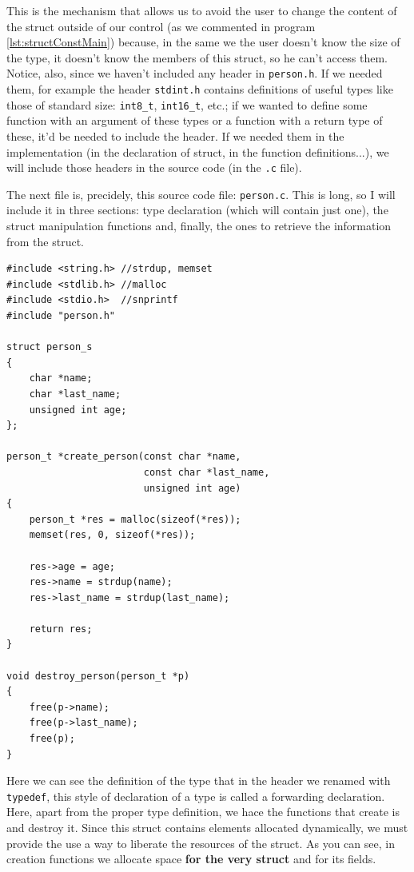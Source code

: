 \documentclass[a4paper]{article}
\begin{document}
This is the mechanism that allows us to avoid the user to change the content of
the struct outside of our control (as we commented in program
\ref{lst:structConstMain}) because, in the same we the user doesn't know the
size of the type, it doesn't know the members of this struct, so he can't
access them. Notice, also, since we haven't included any header in
\verb!person.h!. If we needed them, for example the header \verb!stdint.h!
contains definitions of useful types like those of standard size: \verb!int8_t!,
\verb!int16_t!, etc.; if we wanted to define some function with an argument of
these types or a function with a return type of these, it'd be needed to
include the header. If we needed them in the implementation (in the declaration
of struct, in the function definitions...), we will include those headers in the
source code (in the \verb!.c! file).

The next file is, precidely, this source code file: \verb!person.c!. This is
long, so I will include it in three sections: type declaration (which will
contain just one), the struct manipulation functions and, finally, the ones
to retrieve the information from the struct.

\noindent
\begin{minipage}[H]{\linewidth}
\mbox{}
\begin{lstlisting}[style=C, label={lst:finalExDefinition},
caption={Final example of program -- \texttt{person.c} definitions}]
#include <string.h> //strdup, memset
#include <stdlib.h> //malloc
#include <stdio.h>  //snprintf
#include "person.h"

struct person_s
{
    char *name;
    char *last_name;
    unsigned int age;
};

person_t *create_person(const char *name,
                        const char *last_name,
                        unsigned int age)
{
    person_t *res = malloc(sizeof(*res));
    memset(res, 0, sizeof(*res));

    res->age = age;
    res->name = strdup(name);
    res->last_name = strdup(last_name);

    return res;
}

void destroy_person(person_t *p)
{
    free(p->name);
    free(p->last_name);
    free(p);
}
\end{lstlisting}
\end{minipage}

Here we can see the definition of the type that in the header we renamed with
\verb!typedef!, this style of declaration of a type is called a forwarding
declaration. Here, apart from the proper type definition, we hace the functions
that create is and destroy it. Since this struct contains elements allocated
dynamically, we must provide the use a way to liberate the resources of the
struct. As you can see, in creation functions we allocate space
\textbf{for the very struct} and for its fields.
\end{document}
